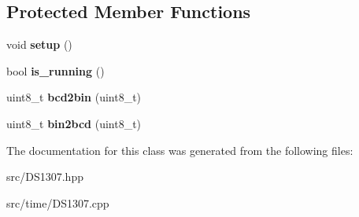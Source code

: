 \subsection*{Protected Member Functions}
\begin{DoxyCompactItemize}
\item 
\mbox{\label{classathome_1_1time_1_1_d_s1307_a8050ac76655291bfe8ada1374044975e}} 
void {\bfseries setup} ()
\item 
\mbox{\label{classathome_1_1time_1_1_d_s1307_a1ba76f50a478dd94d64048ede8af5c45}} 
bool {\bfseries is\+\_\+running} ()
\item 
\mbox{\label{classathome_1_1time_1_1_d_s1307_afbf8528f8ceec1fd3dde59c470c6605e}} 
uint8\+\_\+t {\bfseries bcd2bin} (uint8\+\_\+t)
\item 
\mbox{\label{classathome_1_1time_1_1_d_s1307_abbd3c6698cc2a6c70be1d543fb36853b}} 
uint8\+\_\+t {\bfseries bin2bcd} (uint8\+\_\+t)
\end{DoxyCompactItemize}


The documentation for this class was generated from the following files\+:\begin{DoxyCompactItemize}
\item 
src/D\+S1307.\+hpp\item 
src/time/D\+S1307.\+cpp\end{DoxyCompactItemize}
